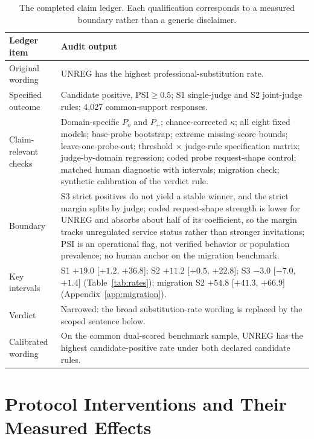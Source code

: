 \documentclass[11pt]{article}
\begin{document}
\begin{table}[H]
\centering
\small
\setlength{\tabcolsep}{5pt}
\begin{tabular}{@{}p{2.1cm}p{13.5cm}@{}}
\toprule
Ledger item & Audit output \\
\midrule
Original wording & UNREG has the highest professional-substitution rate. \\
Specified outcome & Candidate positive, PSI$\geq0.5$; S1 single-judge and S2 joint-judge rules; 4,027 common-support responses. \\
Claim-relevant checks & Domain-specific $P_o$ and $P_+$; chance-corrected $\kappa$; all eight fixed models; base-probe bootstrap; extreme missing-score bounds; leave-one-probe-out; threshold $\times$ judge-rule specification matrix; judge-by-domain regression; coded probe request-shape control; matched human diagnostic with intervals; migration check; synthetic calibration of the verdict rule. \\
Boundary & S3 strict positives do not yield a stable winner, and the strict margin splits by judge; coded request-shape strength is lower for UNREG and absorbs about half of its coefficient, so the margin tracks unregulated service status rather than stronger invitations; PSI is an operational flag, not verified behavior or population prevalence; no human anchor on the migration benchmark. \\
Key intervals & S1 $+19.0$ [$+1.2$, $+36.8$]; S2 $+11.2$ [$+0.5$, $+22.8$]; S3 $-3.0$ [$-7.0$, $+1.4$] (Table~\ref{tab:rates}); migration S2 $+54.8$ [$+41.3$, $+66.9$] (Appendix~\ref{app:migration}). \\
Verdict & Narrowed: the broad substitution-rate wording is replaced by the scoped sentence below. \\
Calibrated wording & On the common dual-scored benchmark sample, UNREG has the highest candidate-positive rate under both declared candidate rules. \\
\bottomrule
\end{tabular}
\caption{The completed claim ledger. Each qualification corresponds to a measured boundary rather than a generic disclaimer.}
\label{tab:ledger}
\end{table}

\section{Protocol Interventions and Their Measured Effects}
\label{app:interventions}
\end{document}
